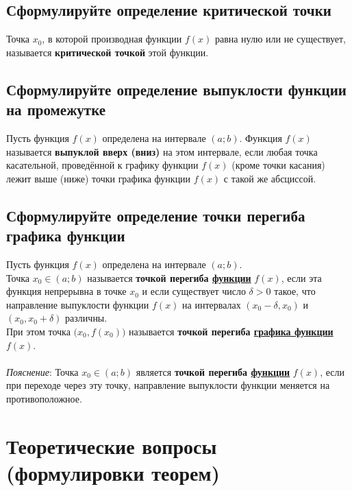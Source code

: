 \subsection{Сформулируйте определение критической точки}
\begin{definition}
    Точка $x_0$, в которой производная функции $f(x)$ равна нулю или не существует, называется \textbf{критической точкой} этой функции.
\end{definition}

\subsection{Сформулируйте определение выпуклости функции на промежутке}
\begin{definition}
    Пусть функция $f(x)$ определена на интервале $(a;b)$. Функция $f(x)$ называется \textbf{выпуклой вверх (вниз)} на этом интервале, если любая точка касательной, проведённой к графику функции $f(x)$ (кроме точки касания) лежит выше (ниже) точки графика функции $f(x)$ с такой же абсциссой.
\end{definition}

\subsection{Сформулируйте определение точки перегиба графика функции}
\begin{definition}
    Пусть функция $f(x)$ определена на интервале $(a;b)$.\\
    Точка $x_0 \in (a;b)$ называется \textbf{точкой перегиба \underline{функции}} $f(x)$, если эта функция непрерывна в точке $x_0$ и если существует число $\delta > 0$ такое, что направление выпуклости функции $f(x)$ на интервалах $(x_0 - \delta, x_0)$ и $(x_0, x_0 + \delta)$ различны.\\
    При этом точка $\big(x_0, f(x_0)\big)$ называется \textbf{точкой перегиба \underline{графика функции}} $f(x)$.\\\\
    \textit{Пояснение}: Точка $x_0 \in (a;b)$ является \textbf{точкой перегиба \underline{функции}} $f(x)$, если при переходе через эту точку, направление выпуклости функции меняется на противоположное.
\end{definition}
\newpage
\section{Теоретические вопросы (формулировки теорем)}

